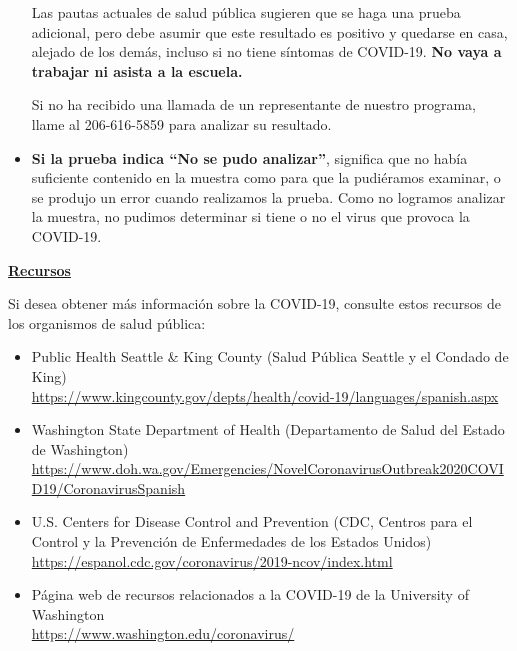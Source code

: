\documentclass[10pt]{article}
\begin{document}
\begin{itemize}
  Las pautas actuales de salud pública sugieren que se haga una prueba
  adicional, pero debe asumir que este resultado es positivo y quedarse en casa,
  alejado de los demás, incluso si no tiene síntomas de COVID-19. \textbf{No
  vaya a trabajar ni asista a la escuela.}

  Si no ha recibido una llamada de un representante de nuestro programa, llame
  al 206-616-5859 para analizar su resultado.

\item

  \textbf{Si la prueba indica ``No se pudo analizar''}, significa que no había
  suficiente contenido en la muestra como para que la pudiéramos examinar, o se
  produjo un error cuando realizamos la prueba. Como no logramos analizar la
  muestra, no pudimos determinar si tiene o no el virus que provoca la COVID-19.


\end{itemize}

\bigskip

\large \underline{\textbf{Recursos}}

Si desea obtener más información sobre la COVID-19, consulte estos recursos de
los organismos de salud pública:

\begin{itemize}
\item
  Public Health \textemdash Seattle \& King County (Salud Pública \textemdash Seattle y el Condado de King)\\
  \url{https://www.kingcounty.gov/depts/health/covid-19/languages/spanish.aspx}

\item

  Washington State Department of Health (Departamento de Salud del Estado de Washington)\\
  \url{https://www.doh.wa.gov/Emergencies/NovelCoronavirusOutbreak2020COVID19/CoronavirusSpanish}

\item
  U.S. Centers for Disease Control and Prevention (CDC, Centros para el Control
  y la Prevención de Enfermedades de los Estados Unidos)\\
  \url{https://espanol.cdc.gov/coronavirus/2019-ncov/index.html}

\item
  Página web de recursos relacionados a la COVID-19 de la University of
  Washington\\
  \url{https://www.washington.edu/coronavirus/}

\end{itemize}
\end{document}
